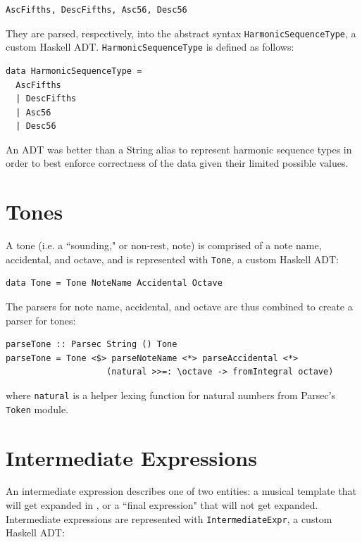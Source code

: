 \documentclass{report}
\begin{document}
\begin{verbatim}
AscFifths, DescFifths, Asc56, Desc56
\end{verbatim}

They are parsed, respectively, into the abstract syntax \verb.HarmonicSequenceType., a custom Haskell ADT. \verb.HarmonicSequenceType. is defined as follows:

\begin{verbatim}
data HarmonicSequenceType = 
  AscFifths
  | DescFifths
  | Asc56 
  | Desc56
\end{verbatim}

An ADT was better than a String alias to represent harmonic sequence types in order to best enforce correctness of the data given their limited possible values. 
\section{Tones}
\label{sec:tones}

A tone (i.e. a ``sounding," or non-rest, note) is comprised of a note name, accidental, and octave, and is represented with \verb.Tone., a custom Haskell ADT:

\begin{verbatim}
data Tone = Tone NoteName Accidental Octave 
\end{verbatim}

The parsers for note name, accidental, and octave are thus combined to create a parser for tones:\newpage

\begin{verbatim}
parseTone :: Parsec String () Tone 
parseTone = Tone <$> parseNoteName <*> parseAccidental <*> 
		            (natural >>=: \octave -> fromIntegral octave)
\end{verbatim}
where \verb.natural. is a helper lexing function for natural numbers from Parsec's \verb.Token. module.

\section{Intermediate Expressions}

An intermediate expression describes one of two entities: a musical template that will get expanded in , or a ``final expression" that will not get expanded. Intermediate expressions are represented with \verb.IntermediateExpr., a custom Haskell ADT:
\end{document}
